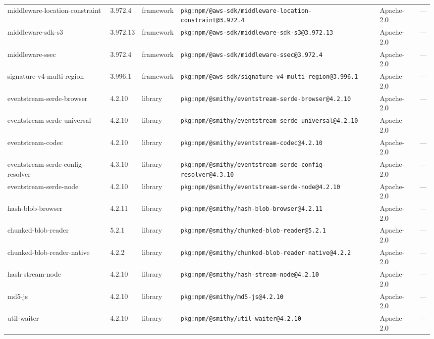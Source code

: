 \documentclass[11pt,a4paper]{article}
\begin{document}
\begin{longtable}{|p{4cm}|p{2cm}|p{1.6cm}|p{5cm}|p{1.5cm}|p{3.5cm}|}
\raggedright middleware-location-constraint & 3.972.4 & framework & \small\texttt{pkg:npm/@aws-sdk/middleware-location-constraint@3.972.4} & Apache-2.0 & \small — \\
\raggedright middleware-sdk-s3 & 3.972.13 & framework & \small\texttt{pkg:npm/@aws-sdk/middleware-sdk-s3@3.972.13} & Apache-2.0 & \small — \\
\raggedright middleware-ssec & 3.972.4 & framework & \small\texttt{pkg:npm/@aws-sdk/middleware-ssec@3.972.4} & Apache-2.0 & \small — \\
\raggedright signature-v4-multi-region & 3.996.1 & framework & \small\texttt{pkg:npm/@aws-sdk/signature-v4-multi-region@3.996.1} & Apache-2.0 & \small — \\
\raggedright eventstream-serde-browser & 4.2.10 & library & \small\texttt{pkg:npm/@smithy/eventstream-serde-browser@4.2.10} & Apache-2.0 & \small — \\
\raggedright eventstream-serde-universal & 4.2.10 & library & \small\texttt{pkg:npm/@smithy/eventstream-serde-universal@4.2.10} & Apache-2.0 & \small — \\
\raggedright eventstream-codec & 4.2.10 & library & \small\texttt{pkg:npm/@smithy/eventstream-codec@4.2.10} & Apache-2.0 & \small — \\
\raggedright eventstream-serde-config-resolver & 4.3.10 & library & \small\texttt{pkg:npm/@smithy/eventstream-serde-config-resolver@4.3.10} & Apache-2.0 & \small — \\
\raggedright eventstream-serde-node & 4.2.10 & library & \small\texttt{pkg:npm/@smithy/eventstream-serde-node@4.2.10} & Apache-2.0 & \small — \\
\raggedright hash-blob-browser & 4.2.11 & library & \small\texttt{pkg:npm/@smithy/hash-blob-browser@4.2.11} & Apache-2.0 & \small — \\
\raggedright chunked-blob-reader & 5.2.1 & library & \small\texttt{pkg:npm/@smithy/chunked-blob-reader@5.2.1} & Apache-2.0 & \small — \\
\raggedright chunked-blob-reader-native & 4.2.2 & library & \small\texttt{pkg:npm/@smithy/chunked-blob-reader-native@4.2.2} & Apache-2.0 & \small — \\
\raggedright hash-stream-node & 4.2.10 & library & \small\texttt{pkg:npm/@smithy/hash-stream-node@4.2.10} & Apache-2.0 & \small — \\
\raggedright md5-js & 4.2.10 & library & \small\texttt{pkg:npm/@smithy/md5-js@4.2.10} & Apache-2.0 & \small — \\
\raggedright util-waiter & 4.2.10 & library & \small\texttt{pkg:npm/@smithy/util-waiter@4.2.10} & Apache-2.0 & \small — \\

\end{longtable}
\end{document}
